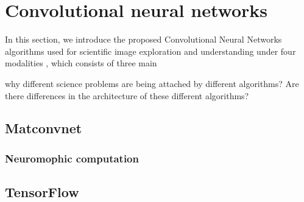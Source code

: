 \section{Convolutional neural networks}
In this section, we introduce the proposed Convolutional Neural Networks algorithms used for scientific image exploration and understanding under four modalities
, which consists of three main

why different science problems are being attached by different algorithms? Are there differences in the architecture of these different algorithms?


\subsection{Matconvnet}

\subsubsection{Neuromophic computation}


\subsection{TensorFlow}
